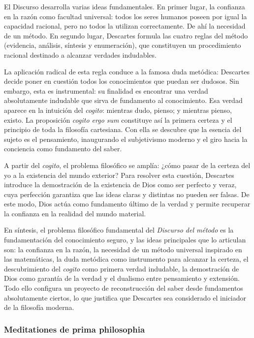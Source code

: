 \documentclass[10pt]{article}
\begin{document}
El Discurso desarrolla varias ideas fundamentales. En primer lugar, la confianza en la razón como facultad universal: todos los seres humanos poseen por igual la capacidad racional, pero no todos la
utilizan correctamente. De ahí la necesidad de un método. En segundo lugar, Descartes formula las cuatro reglas del método (evidencia, análisis, síntesis y enumeración), que constituyen un procedimiento racional
destinado a alcanzar verdades indudables.

La aplicación radical de esta regla conduce a la famosa duda metódica: Descartes decide poner en cuestión todos los conocimientos que puedan ser dudosos. Sin embargo, esta es
instrumental: su finalidad es encontrar una verdad absolutamente indudable que sirva de fundamento al conocimiento. Esa verdad aparece en la intuición del \textit{cogito}: mientras dudo,
pienso; y mientras pienso, existo. La proposición \textit{cogito ergo sum} constituye así la primera certeza y el principio de toda la filosofía cartesiana. Con ella se descubre que la esencia del sujeto
es el pensamiento, inaugurando el subjetivismo moderno y el giro hacia la conciencia como fundamento del saber.

A partir del \textit{cogito}, el problema filosófico se amplía: ¿cómo pasar de la certeza del yo a la existencia del mundo exterior? Para resolver esta cuestión, Descartes introduce la demostración de la
existencia de Dios como ser perfecto y veraz, cuya perfección garantiza que las ideas claras y distintas no pueden ser falsas. De este modo, Dios actúa como fundamento último de la verdad y permite recuperar
la confianza en la realidad del mundo material.

En síntesis, el problema filosófico fundamental del \textit{Discurso del método} es la fundamentación del conocimiento seguro, y las ideas principales que lo articulan son: la confianza en la razón,
la necesidad de un método universal inspirado en las matemáticas, la duda metódica como instrumento para alcanzar la certeza, el descubrimiento del \textit{cogito} como primera verdad indudable, la 
demostración de Dios como garantía de la verdad y el dualismo entre pensamiento y extensión. Todo ello configura un proyecto de reconstrucción del saber desde fundamentos absolutamente ciertos, lo que
justifica que Descartes sea considerado el iniciador de la filosofía moderna.

\subsubsection{Meditationes de prima philosophia}
\end{document}
